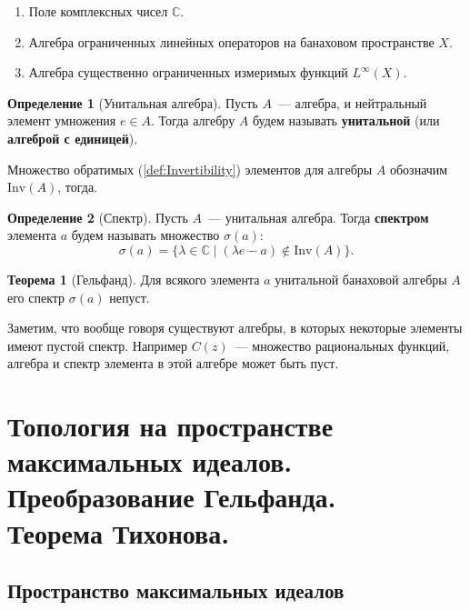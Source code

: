 \documentclass[12pt]{extarticle}
\theoremstyle{definition}
\newtheorem{theorem}{\indent Теорема}[section]
\newtheorem{definition}{\indent Определение}[section]
\begin{document}
        \begin{enumerate}
            \item Поле комплексных чисел $\mathbb{C}$.
            \item Алгебра ограниченных линейных операторов на банаховом пространстве $X$.
            \item Алгебра существенно ограниченных измеримых функций $L^\infty(X)$.
        \end{enumerate}

        \begin{definition}[Унитальная алгебра]\label{def:Unit algebra}
        Пусть $A$~--- алгебра, и нейтральный элемент умножения $e\in A$. Тогда алгебру $A$ будем называть \textbf{унитальной} (или \textbf{алгеброй с единицей}).
        \end{definition}
        Множество обратимых (\ref{def:Invertibility}) элементов для алгебры $A$ обозначим $\mathrm{Inv}(A)$, тогда.
        \begin{definition}[Спектр]\label{def:Spectrum}
            Пусть $A$~--- унитальная алгебра. Тогда \textbf{спектром} элемента $a$ будем называть множество $\sigma(a)$:
            \begin{equation*}
                \sigma(a) = \{\lambda \in \mathbb{C}\mid (\lambda e - a) \notin \mathrm{Inv}(A)\}.
            \end{equation*}
        \end{definition}
        \begin{theorem}[Гельфанд]\label{th:Gelfand}
            Для всякого элемента $a$ унитальной банаховой алгебры $A$ его спектр $\sigma(a)$ непуст.
        \end{theorem}
        Заметим, что вообще говоря существуют алгебры, в которых некоторые элементы имеют пустой спектр. Например $C(z)$~--- множество рациональных функций, алгебра и спектр элемента в этой алгебре может быть пуст.

    \section[Пространство максимальных идеалов]{Топология на пространстве максимальных идеалов. Преобразование Гельфанда.\\Теорема Тихонова.}
    \subsection{Пространство максимальных идеалов}
\end{document}
